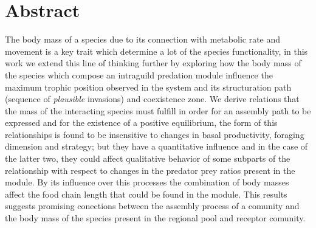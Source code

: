 \section{Abstract}
The body mass of a species due to its connection with metabolic rate and movement is a key trait which determine a lot of the species functionality, in this work we extend this line of thinking further by exploring how the body mass of the species which compose an intraguild predation module influence the maximum trophic position observed in the system and its structuration path (sequence of \textit{plausible} invasions) and coexistence zone. We derive relations that the mass of the interacting species must fulfill in order for an assembly path to be expressed and for the existence of a positive equilibrium, the form of this relationships is found to be insensitive to changes in basal productivity, foraging dimension and strategy; but they have a quantitative influence and in the case of the latter two, they could affect qualitative behavior of some subparts of the relationship with respect to changes in the predator prey ratios present in the module. By its influence over this processes the combination of body masses affect the food chain length that could be found in the module. This results suggests promising conections between the assembly process of a comunity and the body mass of the species present in the regional pool and receptor comunity.
